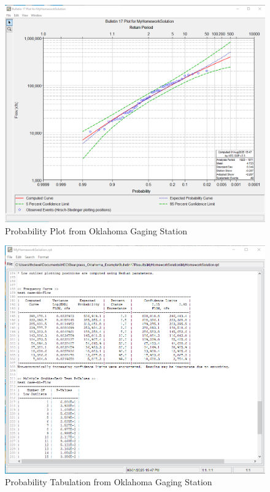 \documentclass[12pt]{article}
\begin{document}
\begin{enumerate}
\begin{figure}[h!] %
   \centering
   \includegraphics[width=7in]{HEC-SSP-plot.png} 
   \caption{Probability Plot from Oklahoma Gaging Station}
   \label{fig:HEC-SSP-interface}
\end{figure}

\begin{figure}[h!] %
   \centering
   \includegraphics[width=7in]{HEC-SSP-tabulation.png} 
   \caption{Probability Tabulation from Oklahoma Gaging Station}
   \label{fig:HEC-SSP-interface}
\end{figure}


\end{enumerate}
\end{document}

